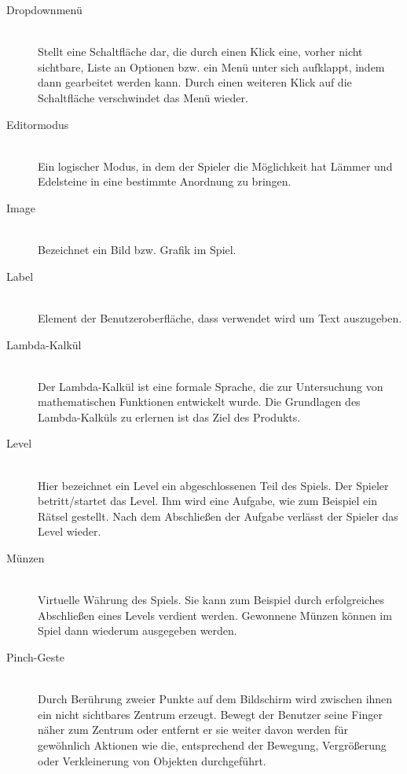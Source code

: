\begin{description}
	\item[Dropdownmenü] \hfill \\
	Stellt eine Schaltfläche dar, die durch einen Klick eine, vorher nicht sichtbare, Liste an Optionen bzw.
	ein Menü unter sich aufklappt, indem dann gearbeitet werden kann. 
	Durch einen weiteren Klick auf die Schaltfläche verschwindet das Menü wieder.
	
	\item[Editormodus] \hfill \\
	Ein logischer Modus, in dem der Spieler die Möglichkeit hat Lämmer und Edelsteine in eine bestimmte Anordnung zu bringen.
	
	\item[Image] \hfill \\
	Bezeichnet ein Bild bzw. Grafik im Spiel.
	
	\item[Label] \hfill \\
	Element der Benutzeroberfläche, dass verwendet wird um Text auszugeben. 
	
	\item[Lambda-Kalkül] \hfill \\
	Der Lambda-Kalkül ist eine formale Sprache, die zur Untersuchung von mathematischen Funktionen entwickelt wurde.
	Die Grundlagen des Lambda-Kalküls zu erlernen ist das Ziel des Produkts.
	
	\item[Level] \hfill \\
	Hier bezeichnet ein Level ein abgeschlossenen Teil des Spiels. Der Spieler betritt/startet das Level. Ihm wird eine Aufgabe,
	wie zum Beispiel ein Rätsel gestellt. Nach dem Abschließen der Aufgabe verlässt der Spieler das Level wieder.
	
	\item[Münzen] \hfill \\
	Virtuelle Währung des Spiels. Sie kann zum Beispiel durch erfolgreiches Abschließen eines Levels verdient werden.
	Gewonnene Münzen können im Spiel dann wiederum ausgegeben werden.
	
	\item[Pinch-Geste] \hfill \\
	Durch Berührung zweier Punkte auf dem Bildschirm wird zwischen ihnen ein nicht sichtbares Zentrum erzeugt.
	Bewegt der Benutzer seine Finger näher zum Zentrum oder entfernt er sie weiter davon werden für gewöhnlich
	Aktionen wie die, entsprechend der Bewegung, Vergrößerung oder Verkleinerung von Objekten durchgeführt.
	

\end{description}
